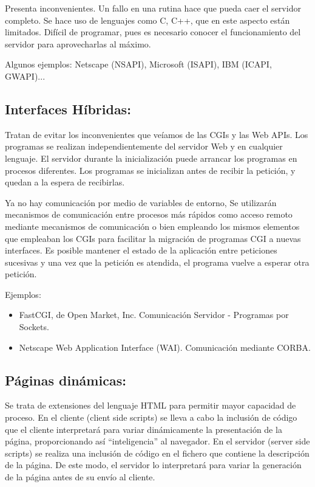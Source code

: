 \documentclass{apuntes}
\begin{document}
Presenta inconvenientes. Un fallo en una rutina hace que pueda caer el servidor completo. Se hace uso de lenguajes como C, C++, que en este aspecto están limitados. Difícil de programar, pues es necesario conocer el funcionamiento del servidor para aprovecharlas al máximo.

Algunos ejemplos: Netscape (NSAPI), Microsoft (ISAPI), IBM (ICAPI, GWAPI)...

\subsection{Interfaces Híbridas:}
Tratan de evitar los inconvenientes que veíamos de las CGIs y las Web APIs.
Los programas se realizan independientemente del servidor Web y en cualquier lenguaje.
El servidor durante la inicialización puede arrancar los programas en procesos diferentes.
Los programas se inicializan antes de recibir la petición, y quedan a la espera de recibirlas.

Ya no hay comunicación por medio de variables de entorno, Se utilizarán mecanismos de comunicación entre procesos más rápidos como acceso remoto mediante mecanismos de comunicación o bien empleando los mismos elementos que empleaban los CGIs para facilitar la migración de programas CGI a nuevas interfaces.
Es posible mantener el estado de la aplicación entre peticiones sucesivas y una vez que la petición es atendida, el programa vuelve a esperar otra petición.

Ejemplos:
\begin{itemize}
\item FastCGI, de Open Market, Inc. Comunicación Servidor - Programas por Sockets.
\item Netscape Web Application Interface (WAI). Comunicación mediante CORBA.
\end{itemize}

\subsection{Páginas dinámicas:}
Se trata de extensiones del lenguaje HTML para permitir mayor capacidad de proceso. En el cliente (client side scripts) se lleva a cabo la inclusión de código que el cliente interpretará para variar dinámicamente la presentación de la página, proporcionando así “inteligencia” al navegador. En el servidor (server side scripts) se realiza una inclusión de código en el fichero que contiene la descripción de la página. De este modo, el servidor lo interpretará para variar la generación de la página antes de su envío al cliente.
\end{document}
